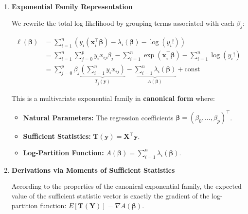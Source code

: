 \documentclass[
  letterpaper,
  DIV=11,
  numbers=noendperiod]{scrreprt}
\providecommand{\tightlist}{%
  \setlength{\itemsep}{0pt}\setlength{\parskip}{0pt}}
\renewcommand{\[}{\begin{equation}}
\renewcommand{\]}{\end{equation}}
\theoremstyle{definition}
\theoremstyle{plain}
\theoremstyle{plain}
\theoremstyle{plain}
\theoremstyle{definition}
\theoremstyle{plain}
\theoremstyle{remark}
\begin{document}
\begin{enumerate}
\def\labelenumi{\arabic{enumi}.}
\item
  \textbf{Exponential Family Representation}

  We rewrite the total log-likelihood by grouping terms associated with
  each \(\beta_j\):

  \[
   \begin{aligned}
   \ell(\boldsymbol{\beta}) &= \sum_{i=1}^n \left( y_i (\mathbf{x}_i^\top \boldsymbol{\beta}) - \lambda_i(\boldsymbol{\beta}) - \log(y_i!) \right) \\
   &= \sum_{i=1}^n \sum_{j=0}^p y_i x_{ij} \beta_j - \sum_{i=1}^n \exp(\mathbf{x}_i^\top \boldsymbol{\beta}) - \sum_{i=1}^n \log(y_i!) \\
   &= \sum_{j=0}^p \beta_j \underbrace{\left( \sum_{i=1}^n y_i x_{ij} \right)}_{T_j(\mathbf{y})} - \underbrace{\sum_{i=1}^n \lambda_i(\boldsymbol{\beta})}_{A(\boldsymbol{\beta})} + \text{const}
   \end{aligned}
   \]

  This is a multivariate exponential family in \textbf{canonical form}
  where:

  \begin{itemize}
  \tightlist
  \item
    \textbf{Natural Parameters:} The regression coefficients
    \(\boldsymbol{\beta} = (\beta_0, \dots, \beta_p)^\top\).
  \item
    \textbf{Sufficient Statistics:}
    \(\mathbf{T}(\mathbf{y}) = \mathbf{X}^\top \mathbf{y}\).
  \item
    \textbf{Log-Partition Function:}
    \(A(\boldsymbol{\beta}) = \sum_{i=1}^n \lambda_i(\boldsymbol{\beta})\).
  \end{itemize}
\item
  \textbf{Derivations via Moments of Sufficient Statistics}

  According to the properties of the canonical exponential family, the
  expected value of the sufficient statistic vector is exactly the
  gradient of the log-partition function:
  \(E[\mathbf{T}(\mathbf{Y})] = \nabla A(\boldsymbol{\beta})\).


\end{enumerate}
\end{document}
